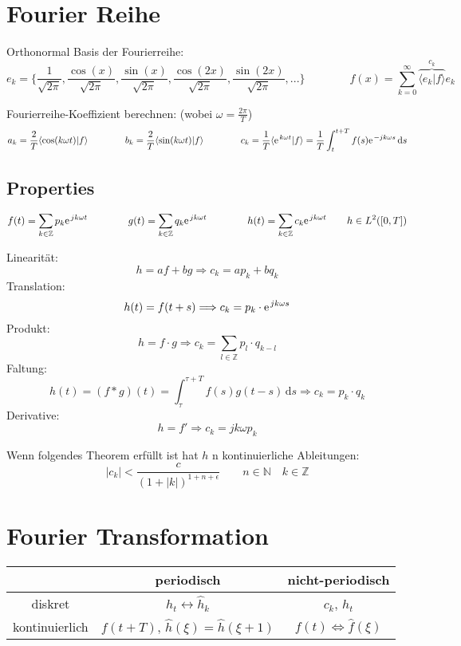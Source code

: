 \section{Fourier Reihe}

Orthonormal Basis der Fourierreihe:
\[  
	e_k=\{\frac{1}{\sqrt{2 \pi}}, \frac{\cos(x)}{\sqrt{2 \pi}}, \frac{\sin(x)}{\sqrt{2 \pi}}, \frac{\cos(2x)}{\sqrt{2 \pi}}, \frac{\sin(2x)}{\sqrt{2 \pi}}, ... \} 
	\qquad \qquad
	f(x) = \sum_{k=0}^{\infty}\overbrace{\langle e_k|f \rangle}^{c_k} e_k
\]

Fourierreihe-Koeffizient berechnen: (wobei $\omega = \frac{2\pi}{T}$)
\[ 	a_k = \frac{2}{T} \langle \cos(k\omega t)|f \rangle 
	\qquad \qquad 
	b_k = \frac{2}{T} \langle \sin(k\omega t)|f \rangle 
	\qquad \qquad
	c_k = \frac{1}{T} \langle \e^{k\omega t}|f \rangle = \frac{1}{T} \int_{t}^{t+T}f(s) \e^{-jk\omega s} \, \mathrm{d}s
\]

\subsection{Properties}
\[  
	f(t) = \sum_{k \in \mathbb{Z}} p_k \e^{jk\omega t} \qquad \qquad g(t) = \sum_{k \in \mathbb{Z}} q_k \e^{jk\omega t} \qquad \qquad h(t) = \sum_{k \in \mathbb{Z}} c_k \e^{jk\omega t} \qquad h \in L^2([0,T])
\]

Linearität:\[ h=af+bg \Longrightarrow c_k=ap_k+bq_k \]
Translation:\[ h(t)=f(t+s) \Longrightarrow c_k=p_k\cdot \e^{jk\omega s} \]
Produkt:\[ h=f\cdot g \Longrightarrow c_k=\sum_{l\in\mathbb{Z}}p_l\cdot q_{k-l} \]
Faltung:\[ h(t)=(f\ast g)(t)=\int_{\tau}^{\tau + T}f(s)g(t-s) \, \mathrm{d}s \Longrightarrow c_k=p_k \cdot q_k \]
Derivative:\[ h=f' \Longrightarrow c_k=jk\omega p_k \]

Wenn folgendes Theorem erfüllt ist hat $h$ n kontinuierliche Ableitungen:
\[ |c_k|<\dfrac{c}{(1+|k|)^{1+n+\epsilon}} \qquad n \in \mathbb{N} \quad k \in \mathbb{Z} \]



\newpage
\section{Fourier Transformation}

\begin{center}
	\begin{tabular}{c|c|c}
		& periodisch & nicht-periodisch \\
		\hline
		diskret & $h_t \leftrightarrow \hat{h}_k$ & $c_k$, $h_t$ \\
		\hline
		kontinuierlich & $f(t+T)$, $\hat{h}(\xi)=\hat{h}(\xi + 1)$ & $f(t)\Leftrightarrow \hat{f}(\xi)$
	\end{tabular}
\end{center}

